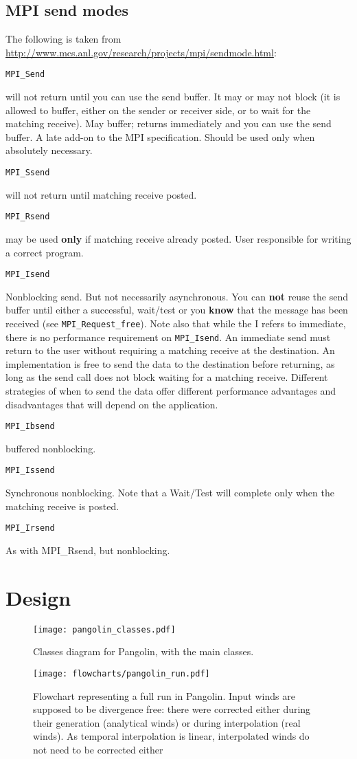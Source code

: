 \section{MPI send modes}
\label{app:mpi_send}
The following is taken from
\url{http://www.mcs.anl.gov/research/projects/mpi/sendmode.html}:

\def\entry#1#2{\leftskip=0pt \texttt{#1}\par\noindent
\leftskip=1.5cm #2\par\indent}

\entry{MPI\_Send}{will not return until you can use the send buffer. It may or may
not block (it is allowed to buffer, either on the sender or receiver side,
or to wait for the matching receive). 
May buffer; returns immediately and you can use the send buffer. A late
add-on to the MPI specification. Should be used only when absolutely
necessary.}
\entry{MPI\_Ssend}{will not return until matching receive posted.}
\entry{MPI\_Rsend}{may be used \textbf{only} if matching receive already posted. User
responsible for writing a correct program.}
\entry{MPI\_Isend}{
    Nonblocking send. But not necessarily asynchronous. You can
    \textbf{not} reuse the send buffer until either a successful,
    wait/test or you \textbf{know} that the message has been received
    (see \texttt{MPI\_Request\_free}). Note also that while the I refers to
    immediate, there is no performance requirement on \texttt{MPI\_Isend}.
    An immediate send must return to the user without requiring
    a matching receive at the destination. An implementation is
    free to send the data to the destination before returning,
    as long as the send call does not block waiting for a
    matching receive. Different strategies of when to send the
    data offer different performance advantages and
    disadvantages that will depend on the application. 
  }
\entry{MPI\_Ibsend}{buffered nonblocking.}
\entry{MPI\_Issend}{
    Synchronous nonblocking. Note that a Wait/Test will
    complete only when the matching receive is posted. 
}
\entry{MPI\_Irsend}{ As with MPI\_Rsend, but nonblocking.}

\chapter{Design}
\begin{figure}[h]
  \centering
  \texttt{[image: pangolin\_classes.pdf]}
  \caption{Classes diagram for Pangolin, with the main classes.}
\end{figure}

\begin{figure}[h]
  \centering
  \texttt{[image: flowcharts/pangolin\_run.pdf]}
  \caption{Flowchart representing a full run in Pangolin. Input winds are
    supposed to be divergence free: there were corrected either during their
    generation (analytical winds) or during interpolation (real winds). As
    temporal interpolation is linear, interpolated winds do not need to be corrected
    either}
  \label{fig:pango_run}
\end{figure}
